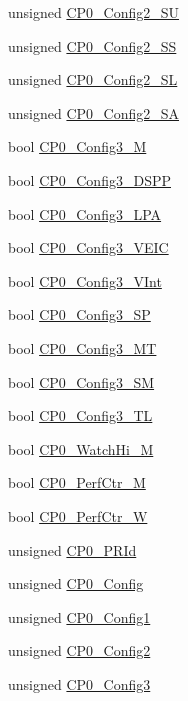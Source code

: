 \begin{DoxyCompactItemize}
\item 
unsigned \hyperlink{structMipsISA_1_1CoreSpecific_a38764718cdc623815be728472698d786}{CP0\_\-Config2\_\-SU}
\item 
unsigned \hyperlink{structMipsISA_1_1CoreSpecific_aae1bc2ea1417d0db78b91318acbf81e0}{CP0\_\-Config2\_\-SS}
\item 
unsigned \hyperlink{structMipsISA_1_1CoreSpecific_a022670f10500f5d221f41e8fa42215e2}{CP0\_\-Config2\_\-SL}
\item 
unsigned \hyperlink{structMipsISA_1_1CoreSpecific_a306b6cf17e98bb5187e91824809b6ca2}{CP0\_\-Config2\_\-SA}
\item 
bool \hyperlink{structMipsISA_1_1CoreSpecific_adfd09308492e45fc88253d1384de8748}{CP0\_\-Config3\_\-M}
\item 
bool \hyperlink{structMipsISA_1_1CoreSpecific_ad949718937f62400400b8814120e8315}{CP0\_\-Config3\_\-DSPP}
\item 
bool \hyperlink{structMipsISA_1_1CoreSpecific_af00732c2492987aff736b4a57e79de3d}{CP0\_\-Config3\_\-LPA}
\item 
bool \hyperlink{structMipsISA_1_1CoreSpecific_ab2e85a6f8c5b1ab842d505cc522b37dd}{CP0\_\-Config3\_\-VEIC}
\item 
bool \hyperlink{structMipsISA_1_1CoreSpecific_ab62f2e7024a18a3ebee0b150c1670ddd}{CP0\_\-Config3\_\-VInt}
\item 
bool \hyperlink{structMipsISA_1_1CoreSpecific_aa21ee0829682a9e2c9415fc5c78831f5}{CP0\_\-Config3\_\-SP}
\item 
bool \hyperlink{structMipsISA_1_1CoreSpecific_a1f7e6a9783e11d23c3114b421a807b16}{CP0\_\-Config3\_\-MT}
\item 
bool \hyperlink{structMipsISA_1_1CoreSpecific_a91e62abe78e2273673d9ded578659446}{CP0\_\-Config3\_\-SM}
\item 
bool \hyperlink{structMipsISA_1_1CoreSpecific_a7e2042e80eb1c09f0031a0ad9d5e998f}{CP0\_\-Config3\_\-TL}
\item 
bool \hyperlink{structMipsISA_1_1CoreSpecific_ad8d35683658792d6083955f5489158eb}{CP0\_\-WatchHi\_\-M}
\item 
bool \hyperlink{structMipsISA_1_1CoreSpecific_ad81f26165ba1e8ad0616aa3c16e7ff07}{CP0\_\-PerfCtr\_\-M}
\item 
bool \hyperlink{structMipsISA_1_1CoreSpecific_aa5dad50dbba60cd0e723758bd3c72578}{CP0\_\-PerfCtr\_\-W}
\item 
unsigned \hyperlink{structMipsISA_1_1CoreSpecific_afa11ea4cfbe9c9e42a8eabe0999c463e}{CP0\_\-PRId}
\item 
unsigned \hyperlink{structMipsISA_1_1CoreSpecific_a2448223ea71e8e5c7e94d2542ca2c41a}{CP0\_\-Config}
\item 
unsigned \hyperlink{structMipsISA_1_1CoreSpecific_a0fa6436dd8f729f7061f3fd4776045b0}{CP0\_\-Config1}
\item 
unsigned \hyperlink{structMipsISA_1_1CoreSpecific_a7d272f4daa6a388a244d8fef3d2d9dc3}{CP0\_\-Config2}
\item 
unsigned \hyperlink{structMipsISA_1_1CoreSpecific_a0a1819308c9af6ba0d31c57abff67308}{CP0\_\-Config3}
\end{DoxyCompactItemize}


